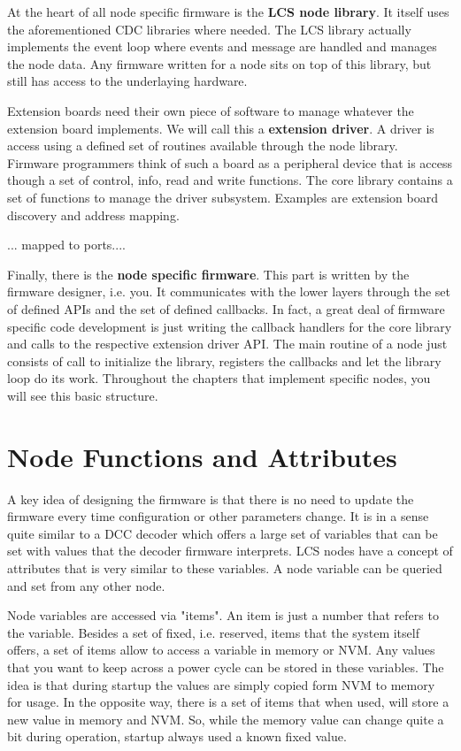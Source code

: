 At the heart of all node specific firmware is the \textbf{LCS node library}. It itself uses the aforementioned CDC libraries where needed. The LCS library actually implements the event loop where events and message are handled and manages the node data. Any firmware written for a node sits on top of this library, but still has access to the underlaying hardware. 

Extension boards need their own piece of software to manage whatever the extension board implements. We will call this a \textbf{extension driver}. A driver is access using a defined set of routines available through the node library. Firmware programmers think of such a board as a peripheral device that is access though a set of control, info, read and write functions. The core library contains a set of functions to manage the driver subsystem. Examples are extension board discovery and address mapping.

... mapped to ports....

Finally, there is the \textbf{node specific firmware}. This part is written by the firmware designer, i.e. you. It communicates with the lower layers through the set of defined APIs and the set of defined callbacks. In fact, a great deal of firmware specific code development is just writing the callback handlers for the core library and calls to the respective extension driver API.  The main routine of a node just consists of call to initialize the library, registers the callbacks and let the library loop do its work. Throughout the chapters that implement specific nodes, you will see this basic structure.

\section{Node Functions and Attributes}

A key idea of designing the firmware is that there is no need to update the firmware every time configuration or other parameters change. It is in a sense quite similar to a DCC decoder which offers a large set of variables that can be set with values that the decoder firmware interprets. LCS nodes have a concept of attributes that is very similar to these variables. A node variable can be queried and set from any other node.

Node variables are accessed via "items". An item is just a number that refers to the variable. Besides a set of fixed, i.e. reserved, items that the system itself offers, a set of items allow to access a variable in memory or NVM. Any values that you want to keep across a power cycle can be stored in these variables. The idea is that during startup the values are simply copied form NVM to memory for usage. In the opposite way, there is a set of items that when used, will store a new value in memory and NVM. So, while the memory value can change quite a bit during operation, startup always used a known fixed value.

